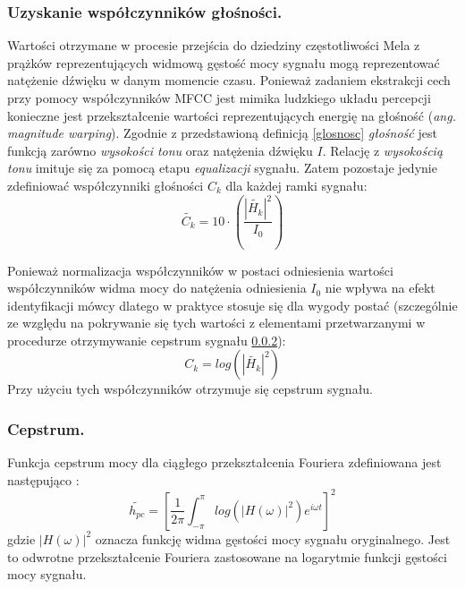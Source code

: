 \subsubsection{Uzyskanie współczynników głośności.}
Wartości otrzymane w procesie przejścia do dziedziny częstotliwości Mela z prążków reprezentujących widmową gęstość mocy sygnału mogą reprezentować natężenie dźwięku w danym momencie czasu. Ponieważ zadaniem ekstrakcji cech przy pomocy współczynników MFCC jest mimika ludzkiego układu percepcji konieczne jest przekształcenie wartości reprezentujących energię na głośność (\textit{ang. magnitude warping}). Zgodnie z przedstawioną definicją \ref{glosnosc} \textit{głośność} jest funkcją zarówno \textit{wysokości tonu} oraz natężenia dźwięku $ I $. Relację z \textit{wysokością tonu} imituje się za pomocą etapu \textit{equalizacji} sygnału. Zatem pozostaje jedynie zdefiniować współczynniki głośności $ C_k $ \cite{fosr} dla każdej ramki sygnału:
\begin{equation}
  \tilde{C_k} = 10 \cdot \left( \frac{|\tilde{H_k}|^2}{I_0} \right) 
\end{equation}

Ponieważ normalizacja współczynników w postaci odniesienia wartości współczynników widma mocy do natężenia odniesienia $I_0$ nie wpływa na efekt identyfikacji mówcy dlatego w praktyce stosuje się dla wygody postać (szczególnie ze względu na pokrywanie się tych wartości z elementami przetwarzanymi w procedurze otrzymywanie cepstrum sygnału \ref{cepstrum}):
\begin{equation}
  C_k = log \left(|\tilde{H_k}|^2 \right)
\end{equation}
Przy użyciu tych współczynników otrzymuje się cepstrum sygnału.

\subsubsection{Cepstrum.}
\label{cepstrum}

Funkcja cepstrum mocy dla ciągłego przekształcenia Fouriera zdefiniowana jest następująco \cite{fosr}:
\begin{equation}
    \tilde{h_{pc}} = \left[\frac{1}{2\pi}\int_{-\pi}^{\pi}log\left(| H(\omega)  |^2\right)e^{i \omega t}\right]^2
\end{equation}
gdzie $ |H(\omega)|^2 $ oznacza funkcję widma gęstości mocy sygnału oryginalnego. Jest to odwrotne przekształcenie Fouriera zastosowane na logarytmie funkcji gęstości mocy sygnału.
   

